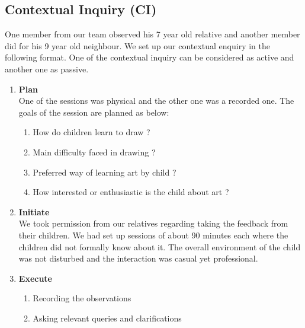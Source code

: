 \documentclass{scrreprt}
\begin{document}
\subsection{Contextual Inquiry (CI)}
\vspace{-2pt}
One member from our team observed his 7 year old relative and another member did for his 9 year old neighbour. We set up our contextual enquiry in the following format. One of the contextual inquiry can be considered as active and another one as passive.
\vspace{-2pt}
\begin{enumerate}[itemsep=0.5pt]
    \item \textbf{Plan} \\ 
     One of the sessions was physical and the other one was a recorded one.
     The goals of the session are planned as below:
    \begin{enumerate}[itemsep=0.5pt]
        \item How do children learn to draw ?
        \item Main difficulty faced in drawing ?
        \item Preferred way of learning art by child ?
        \item How interested or enthusiastic is the child about art ?
    \end{enumerate}
    
    \item \textbf{Initiate} \\
    We took permission from our relatives regarding taking the feedback from their children. We had set up sessions of about 90 minutes each where the children did not formally know about it. The overall environment of the child was not disturbed and the interaction was casual yet professional.
    
    \item \textbf{Execute}
    \begin{enumerate}[itemsep=0.5pt]
        \item Recording the observations
        \item Asking relevant queries and clarifications
    \end{enumerate}
    \vspace{3pt}
    

\end{enumerate}
\end{document}
